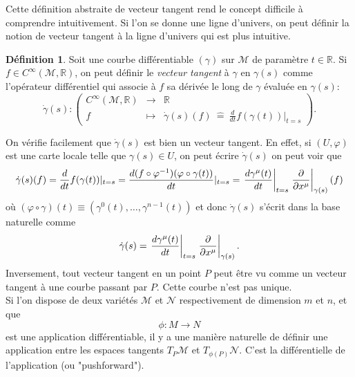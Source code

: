\documentclass[a4paper,11pt]{report}
\theoremstyle{definition}
\theoremstyle{plain}
\theoremstyle{definition}
\newtheorem{defn}{Définition}[chapter]
\theoremstyle{remark}
\newcommand{\M}{\mathscr{M}}
\newcommand{\N}{\mathscr{N}}
\begin{document}
                Cette définition abstraite de vecteur tangent rend le concept difficile à comprendre intuitivement. Si l'on se donne une ligne d'univers, on peut définir la notion de vecteur tangent à la ligne d'univers qui est plus intuitive.
                \begin{defn}
                    Soit une courbe différentiable $(\gamma)$ sur $\M$ de paramètre $t\in\mathbb{R}$. Si $f\in C^\infty(\M,\mathbb{R})$, on peut définir le \textit{vecteur tangent} à $\gamma$ en $\gamma(s)$ comme l'opérateur différentiel qui associe à $f$ sa dérivée le long de $\gamma$ évaluée en $\gamma(s)$:
                    \begin{equation}
                    \dot{\gamma}(s):\left(
                    \begin{array}{ccc}
                        C^\infty(\M,\mathbb{R}) & \longrightarrow & \mathbb{R} \\
                        f & \longmapsto &\dot{\gamma}(s)(f) ~\hat{=}~ \frac{d}{dt}f(\gamma(t))|_{t=s}
                    \end{array}
                    \right).
                    \end{equation}
                \end{defn}
                
                On vérifie facilement que $\dot{\gamma}(s)$ est bien un vecteur tangent. En effet, si $(U,\varphi)$ est une carte locale telle que $\gamma(s)\in U$, on peut écrire $\dot{\gamma}(s)$ on peut voir que
                \begin{equation}
                    \dot{\gamma}(s)(f) = \frac{d}{dt}f(\gamma(t))|_{t=s}= \frac{d(f\circ\varphi^{-1})(\varphi\circ\gamma(t))}{dt}|_{t=s}= \eval{\frac{d\gamma^\mu(t)}{dt}}_{t=s}\eval{\pdv{}{x^\mu}}_{\gamma(s)}(f)
                \end{equation}
                où $(\varphi\circ\gamma)(t)\equiv(\gamma^0(t),\dots,\gamma^{n-1}(t))$ et donc $\dot{\gamma}(s)$ s'écrit dans la base naturelle comme
                \begin{equation}
                     \dot{\gamma}(s) =  \eval{\frac{d\gamma^\mu(t)}{dt}}_{t=s}\eval{\pdv{}{x^\mu}}_{\gamma(s)}.
                \end{equation}
                Inversement, tout vecteur tangent en un point $P$ peut être vu comme un vecteur tangent à une courbe passant par $P$. Cette courbe n'est pas unique.\\
                
                Si l'on dispose de deux variétés $\M$ et $\N$ respectivement de dimension $m$ et $n$, et que 
                \begin{equation*}
                    \phi : M\to N
                \end{equation*}
                est une application différentiable, il y a une manière naturelle de définir une application entre les espaces tangents $T_P\M$ et $T_{\phi(P)}\N$. C'est la différentielle de l'application (ou "pushforward").
                
\end{document}
